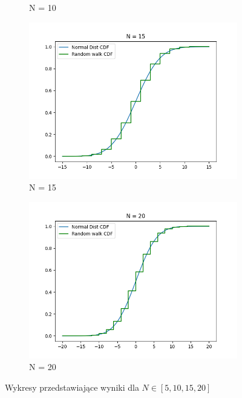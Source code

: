 \documentclass{report}
\begin{document}
\begin{figure}[H]
\begin{subfigure}{.5\textwidth}
      \caption{N = 10}
      \label{fig:plotbnfunc2}
    \end{subfigure}
    \begin{subfigure}{.5\textwidth}
        \centering
        \includegraphics[width=1.1\linewidth]{plotN15.png}
        \caption{N = 15}
        \label{fig:plotbnfunc1}
    \end{subfigure}%
    \begin{subfigure}{.5\textwidth}
        \centering
        \includegraphics[width=1.1\linewidth]{plotN20.png}
        \caption{N = 20}
        \label{fig:plotbnfunc1}
    \end{subfigure}%
    \caption{Wykresy przedstawiające wyniki dla \(N\in[5,10,15,20] \)}
    \label{fig:bn}
\end{figure}
\end{document}
